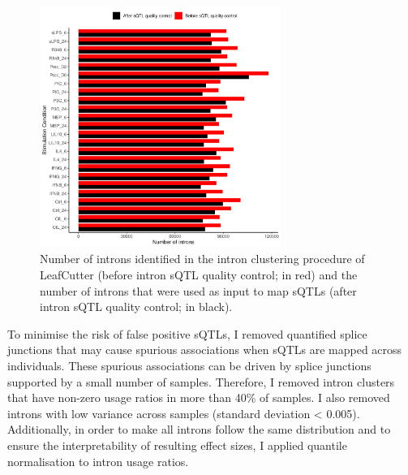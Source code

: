 \begin{figure}[H]
  \centering
  \includegraphics[width=0.7\textwidth]{qc_introns_num}
  \caption[Number of introns before and after intron quality control]{Number of introns identified in the intron clustering procedure of
  LeafCutter (before intron sQTL quality control; in red) and the number of introns that were
  used as input to map sQTLs (after intron sQTL quality control; in black).}
  \label{fig:qc_introns_num}   
\end{figure}

To minimise the risk of false positive sQTLs, I removed quantified splice junctions that may cause spurious associations when sQTLs are mapped across individuals. These spurious associations can be driven by splice junctions supported by a small number of samples. Therefore, I removed intron clusters that have non-zero usage ratios in more than 40\% of samples. I also removed introns with low variance across samples (standard deviation < 0.005). Additionally, in order to make all introns follow the same distribution and to ensure the interpretability of resulting effect sizes, I applied quantile normalisation to intron usage ratios. %
